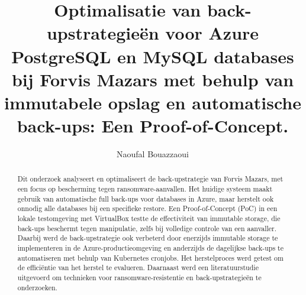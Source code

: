 \documentclass[a0,portrait]{hogent-poster}
\title{Optimalisatie van back-upstrategieën voor Azure PostgreSQL en MySQL databases bij Forvis Mazars met behulp van immutabele opslag en automatische back-ups: Een Proof-of-Concept.}
\author{Naoufal Bouazzaoui}
\begin{document}
\maketitle

\begin{abstract}
Dit onderzoek analyseert en optimaliseert de back-upstrategie van Forvis Mazars, met een focus op bescherming tegen ransomware-aanvallen. Het huidige systeem maakt gebruik van automatische full back-ups voor databases in Azure, maar herstelt ook onnodig alle databases bij een specifieke restore. Een Proof-of-Concept (PoC) in een lokale testomgeving met VirtualBox testte de effectiviteit van immutable storage, die back-ups beschermt tegen manipulatie, zelfs bij volledige controle van een aanvaller. Daarbij werd de back-upstrategie ook verbeterd door enerzijds immutable storage te implementeren in de Azure-productieomgeving en anderzijds de dagelijkse back-ups te automatiseren met behulp van Kubernetes cronjobs. Het herstelproces werd getest om de efficiëntie van het herstel te evalueren. Daarnaast werd een literatuurstudie uitgevoerd om technieken voor ransomware-resistentie en back-upstrategieën te onderzoeken.
\end{abstract}
\end{document}

